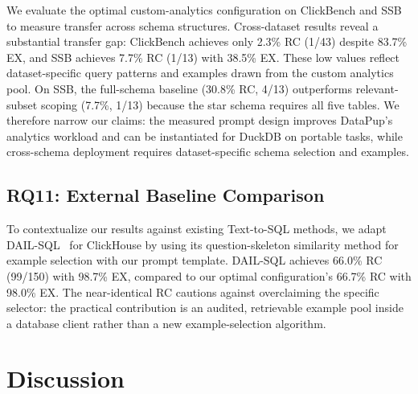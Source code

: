 \documentclass[sigconf, nonacm]{acmart}
\begin{document}
We evaluate the optimal custom-analytics configuration on ClickBench and SSB to measure transfer across schema structures. Cross-dataset results reveal a substantial transfer gap: ClickBench achieves only 2.3\% RC (1/43) despite 83.7\% EX, and SSB achieves 7.7\% RC (1/13) with 38.5\% EX. These low values reflect dataset-specific query patterns and examples drawn from the custom analytics pool. On SSB, the full-schema baseline (30.8\% RC, 4/13) outperforms relevant-subset scoping (7.7\%, 1/13) because the star schema requires all five tables. We therefore narrow our claims: the measured prompt design improves DataPup's analytics workload and can be instantiated for DuckDB on portable tasks, while cross-schema deployment requires dataset-specific schema selection and examples.

\subsection{RQ11: External Baseline Comparison}
\label{sec:baseline}

To contextualize our results against existing Text-to-SQL methods, we adapt DAIL-SQL~\cite{gao2024dailsql} for ClickHouse by using its question-skeleton similarity method for example selection with our prompt template. DAIL-SQL achieves 66.0\% RC (99/150) with 98.7\% EX, compared to our optimal configuration's 66.7\% RC with 98.0\% EX. The near-identical RC cautions against overclaiming the specific selector: the practical contribution is an audited, retrievable example pool inside a database client rather than a new example-selection algorithm.

\section{Discussion}
\label{sec:discussion}
\end{document}
